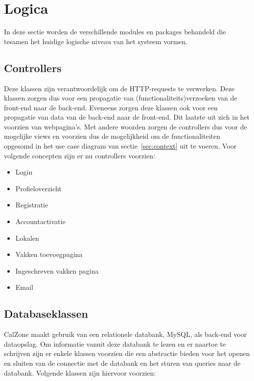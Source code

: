\section{Logica}
\label{sec:logica}

In deze sectie worden de verschillende modules en packages behandeld die tesamen het huidige logische niveau van het systeem vormen.

\subsection{Controllers}
\label{subsec:controllers}

Deze klassen zijn verantwoordelijk om de HTTP-requests te verwerken. 
Deze klassen zorgen dus voor een propagatie van (functionaliteits)verzoeken van de front-end naar de back-end. 
Eveneens zorgen deze klassen ook voor een propagatie van data van de back-end naar de front-end. 
Dit laatste uit zich in het voorzien van webpagina's.
Met andere woorden zorgen de controllers dus voor de mogelijke views en voorzien dus de mogelijkheid om de functionaliteiten opgesomd in het use case diagram van sectie~\ref{sec:context} uit te voeren. 
Voor volgende concepten zijn er nu controllers voorzien:

\begin{itemize}
	\item Login
	\item Profieloverzicht
	\item Registratie
	\item Accountactivatie
	\item Lokalen
	\item Vakken toevoegpagina
	\item Ingeschreven vakken pagina
	\item Email
\end{itemize}

\subsection{Databaseklassen}
\label{subsec:databaseklassen}

CalZone maakt gebruik van een relationele databank, MySQL, als back-end voor dataopslag. 
Om informatie vanuit deze databank te lezen en er naartoe te schrijven zijn er enkele klassen voorzien die een abstractie bieden voor het openen en sluiten van de connectie met de databank en het sturen van queries naar de databank. 
Volgende klassen zijn hiervoor voorzien:


